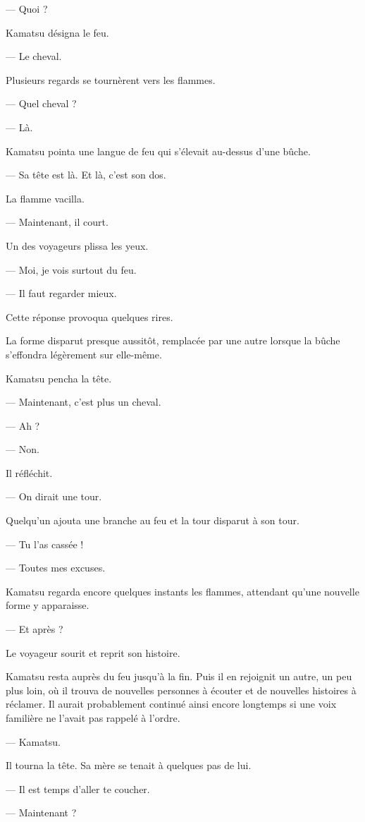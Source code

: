 — Quoi ?

Kamatsu désigna le feu.

— Le cheval.

Plusieurs regards se tournèrent vers les flammes.

— Quel cheval ?

— Là.

Kamatsu pointa une langue de feu qui s'élevait au-dessus d'une bûche.

— Sa tête est là. Et là, c'est son dos.

La flamme vacilla.

— Maintenant, il court.

Un des voyageurs plissa les yeux.

— Moi, je vois surtout du feu.

— Il faut regarder mieux.

Cette réponse provoqua quelques rires.

La forme disparut presque aussitôt, remplacée par une autre lorsque la bûche
s'effondra légèrement sur elle-même.

Kamatsu pencha la tête.

— Maintenant, c'est plus un cheval.

— Ah ?

— Non.

Il réfléchit.

— On dirait une tour.

Quelqu'un ajouta une branche au feu et la tour disparut à son tour.

— Tu l'as cassée !

— Toutes mes excuses.

Kamatsu regarda encore quelques instants les flammes, attendant qu'une nouvelle
forme y apparaisse.

— Et après ?

Le voyageur sourit et reprit son histoire.

Kamatsu resta auprès du feu jusqu'à la fin. Puis il en rejoignit un autre, un
peu plus loin, où il trouva de nouvelles personnes à écouter et de nouvelles
histoires à réclamer. Il aurait probablement continué ainsi encore longtemps
si une voix familière ne l'avait pas rappelé à l'ordre.

— Kamatsu.

Il tourna la tête. Sa mère se tenait à quelques pas de lui.

— Il est temps d'aller te coucher.

— Maintenant ?

